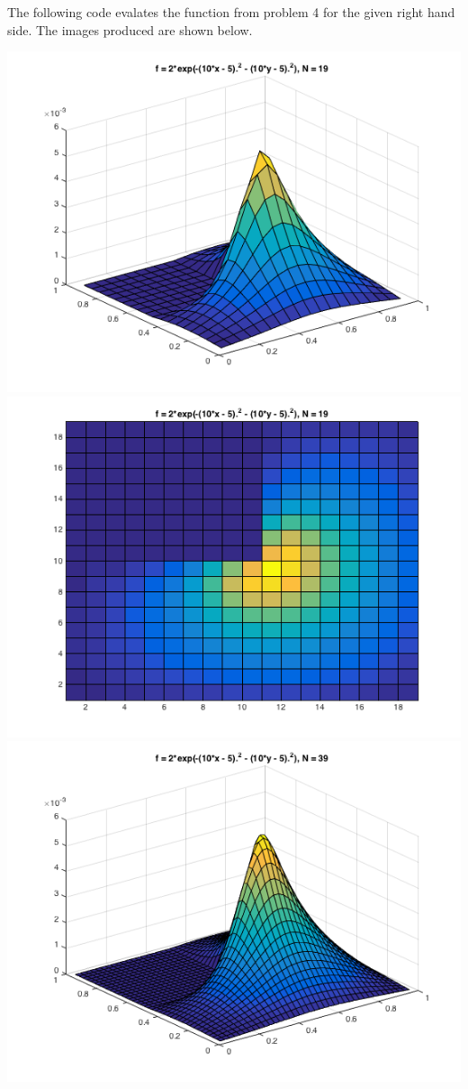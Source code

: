 \documentclass[11pt, oneside, titlepage]{article}
\begin{document}
\begin{enumerate}
        The following code evalates the function from problem 4 for the
        given right hand side.
        The images produced are shown below.
        
        \begin{center}
            \includegraphics[scale=.5]{Figures/03_7_1.png}
            \includegraphics[scale=.5]{Figures/03_7_2.png}
            \includegraphics[scale=.5]{Figures/03_7_3.png}

\end{center}
\end{enumerate}
\end{document}
